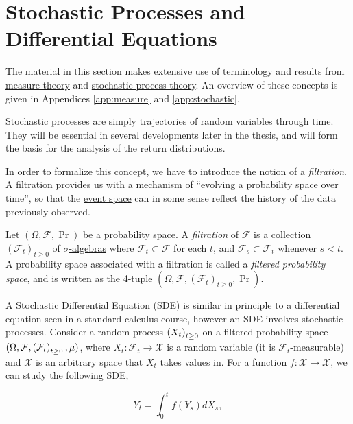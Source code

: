\section{Stochastic Processes and Differential Equations}\label{s:stochastic-processes}
The material in this section makes extensive use of terminology and
results from \hyperref[app:measure]{measure theory} and
\hyperref[app:stochastic]{stochastic process theory}. An overview of these concepts is
given in Appendices \ref{app:measure} and \ref{app:stochastic}.

Stochastic processes are simply trajectories of random variables
through time. They will be essential in several developments later in
the thesis, and will form the basis for the analysis of the return
distributions.

In order to formalize this concept, we have to introduce the notion of
a \emph{filtration}. A filtration provides us with a mechanism of
``evolving a \hyperref[def:probability-space]{probability space} over
time'', so that the \hyperref[def:measure]{event space}
can in some sense reflect the history of the data previously observed.

\begin{definition}\label{def:filtration}
  Let $(\Omega, \mathcal{F}, \Pr)$ be a probability space. A
  \emph{filtration} of $\mathcal{F}$ is a collection
  $(\mathcal{F}_t)_{t\geq 0}$ of
  \hyperref[def:sigma-algebra]{$\sigma$-algebras} where $\mathcal{F}_t\subset\mathcal{F}$
  for each $t$, and $\mathcal{F}_s\subset\mathcal{F}_t$ whenever
  $s<t$. A probability space associated with a filtration is called a
  \emph{filtered probability space}, and is written as the 4-tuple
  $(\Omega, \mathcal{F}, (\mathcal{F}_t)_{t\geq 0}, \Pr)$.
\end{definition}

A Stochastic Differential Equation (SDE) is similar in principle to a
differential equation seen in a standard calculus course, however an
SDE involves stochastic processes. Consider a random process
$\indexedabove{t}{X}$ on a filtered probability space $(\Omega,
\mathcal{F}, \indexedabove{t}{\mathcal{F}}, \mu)$, where
$X_t:\mathcal{F}_t\to\mathcal{X}$ is a 
random variable (it is $\mathcal{F}_t$-measurable) and $\mathcal{X}$
is an arbitrary space that $X_t$ takes values in. For a function
$f:\mathcal{X}\to\mathcal{X}$, we can study the following SDE,

\begin{equation}\label{eq:sde:general}
  Y_t = \int_{0}^tf(Y_s)dX_s,
\end{equation}

